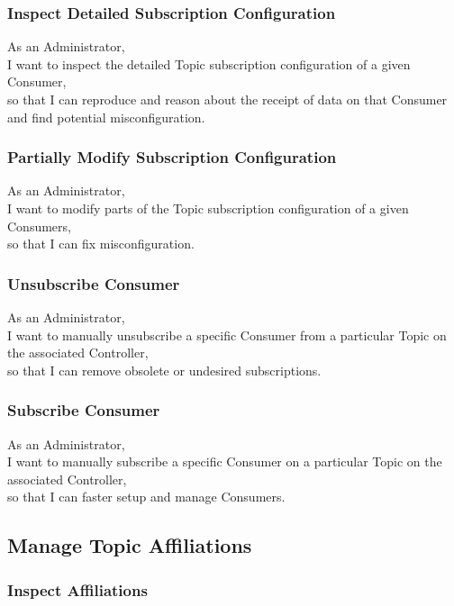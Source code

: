 \subsubsection{Inspect Detailed Subscription Configuration}

As an Administrator, \\
I want to inspect the detailed Topic subscription configuration of a given Consumer, \\
so that I can reproduce and reason about the receipt of data on that Consumer
and find potential misconfiguration.

\subsubsection{Partially Modify Subscription Configuration}

As an Administrator, \\
I want to modify parts of the Topic subscription configuration of a given Consumers, \\
so that I can fix misconfiguration.

\subsubsection{Unsubscribe Consumer}

As an Administrator, \\
I want to manually unsubscribe a specific Consumer from a particular Topic on the associated Controller, \\
so that I can remove obsolete or undesired subscriptions.

\subsubsection{Subscribe Consumer}

As an Administrator, \\
I want to manually subscribe a specific Consumer on a particular Topic on the associated Controller, \\
so that I can faster setup and manage Consumers.

\subsection{Manage Topic Affiliations}
\subsubsection{Inspect Affiliations}

